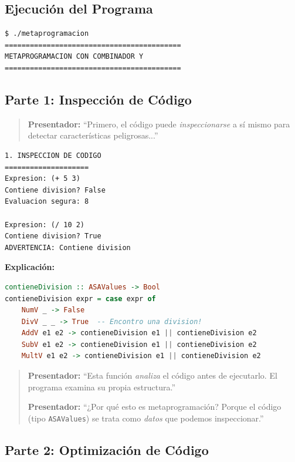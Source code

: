 \documentclass[12pt]{article}
\begin{document}
\subsection*{Ejecución del Programa}

\begin{verbatim}
$ ./metaprogramacion
==========================================
METAPROGRAMACION CON COMBINADOR Y
==========================================
\end{verbatim}

\subsection*{Parte 1: Inspección de Código}

\begin{quote}
\textbf{Presentador:} ``Primero, el código puede \textit{inspeccionarse} a sí mismo para detectar características peligrosas...''
\end{quote}

\begin{verbatim}
1. INSPECCION DE CODIGO
====================
Expresion: (+ 5 3)
Contiene division? False
Evaluacion segura: 8

Expresion: (/ 10 2)
Contiene division? True
ADVERTENCIA: Contiene division
\end{verbatim}

\textbf{Explicación:}

\begin{lstlisting}[language=Haskell, caption=Inspección de código]
contieneDivision :: ASAValues -> Bool
contieneDivision expr = case expr of
    NumV _ -> False
    DivV _ _ -> True  -- Encontro una division!
    AddV e1 e2 -> contieneDivision e1 || contieneDivision e2
    SubV e1 e2 -> contieneDivision e1 || contieneDivision e2
    MultV e1 e2 -> contieneDivision e1 || contieneDivision e2
\end{lstlisting}

\begin{quote}
\textbf{Presentador:} ``Esta función \textit{analiza} el código antes de ejecutarlo. El programa examina su propia estructura.''

\textbf{Presentador:} ``¿Por qué esto es metaprogramación? Porque el código (tipo \texttt{ASAValues}) se trata como \textit{datos} que podemos inspeccionar.''
\end{quote}

\newpage
\subsection*{Parte 2: Optimización de Código}
\end{document}
